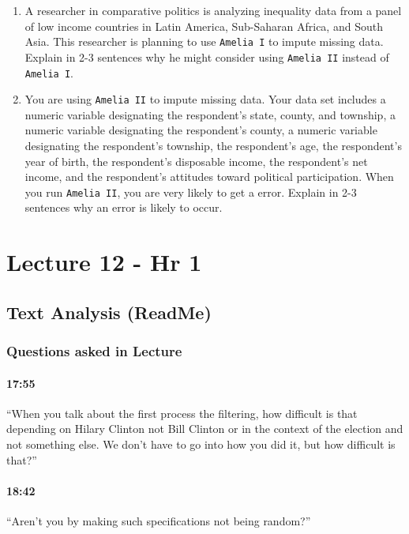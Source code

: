 \documentclass[11pt]{article}
\begin{document}
\begin{enumerate}
\item A researcher in comparative politics is analyzing inequality data from a panel of low income countries in Latin America, Sub-Saharan Africa, and South Asia. This researcher is planning to use {\tt Amelia I} to impute missing data. Explain in 2-3 sentences why he might consider using {\tt Amelia II} instead of {\tt Amelia I}.
\item  You are using {\tt Amelia II} to impute missing data. Your data set includes a numeric variable designating the respondent's state, county, and township, a numeric variable designating the respondent's county, a numeric variable designating the respondent's township, the respondent's age, the respondent's year of birth, the respondent's disposable income, the respondent's net income, and the respondent's attitudes toward political participation. When you run {\tt Amelia II}, you are very likely to get a error. Explain in 2-3 sentences why an error is likely to occur. %
\end{enumerate}

\section{Lecture 12 - Hr 1}

\subsection{Text Analysis (ReadMe)}

\subsubsection{Questions asked in Lecture}

\paragraph{17:55} ``When you talk about the first process the filtering, how difficult is that depending on Hilary Clinton not Bill Clinton or in the context of the election and not something else.  We don't have to go into how you did it, but how difficult is that?''

\paragraph{18:42} ``Aren't you by making such specifications not being random?''
\end{document}
